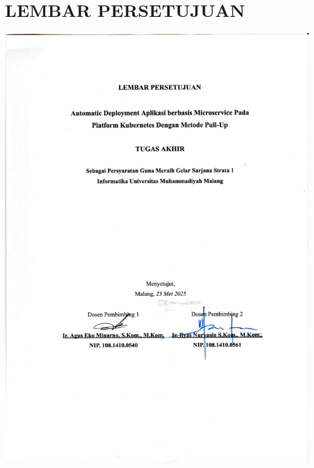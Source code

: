 \chapter*{\uppercase{LEMBAR PERSETUJUAN}}
\vspace{1cm}

\begin{center}
    \includegraphics[width=\textwidth,page=1]{misc/lembar-persetujuan-scan_merge.pdf}
\end{center}

\newpage
